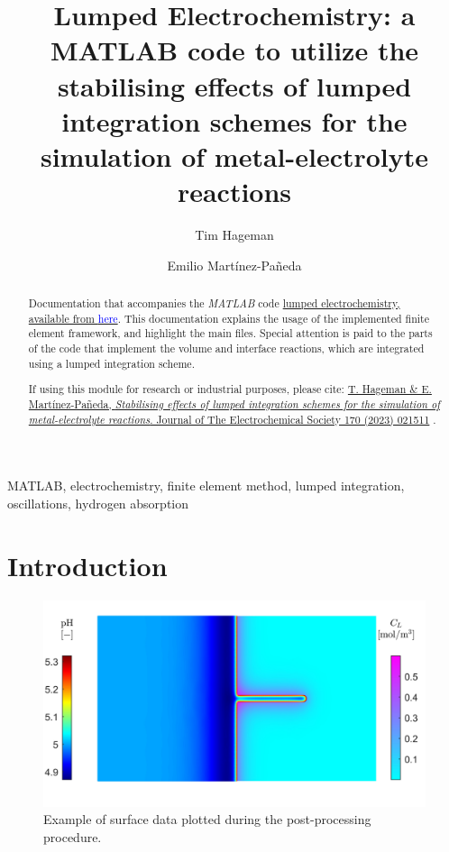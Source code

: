 \documentclass[3p]{elsarticle} %
\newcommand{\citeMe}{\href{http://doi.org/10.1149/1945-7111/acb971}{T. Hageman \& E. Martínez-Pañeda, \textit{Stabilising effects of lumped integration schemes for the simulation of metal-electrolyte reactions}. Journal of The Electrochemical Society 170 (2023) 021511} \citep{Hageman2023}}
\begin{document}
\begin{frontmatter}
\title{Lumped Electrochemistry: a MATLAB code to utilize the stabilising effects of lumped integration schemes for the simulation of metal-electrolyte reactions}

\author{Tim Hageman }
\author{Emilio Martínez-Pañeda}

\address{Department of Civil and Environmental Engineering, Imperial College London, London SW7 2AZ, UK}

\begin{abstract}
Documentation that accompanies the \textit{MATLAB} code \href{https://github.com/T-Hageman/Lumped_Electrochemistry}{lumped electrochemistry, available from \textcolor{blue}{here}}. This documentation explains the usage of the implemented finite element framework, and highlight the main files. Special attention is paid to the parts of the code that implement the volume and interface reactions, which are integrated using a lumped integration scheme. 

If using this module for research or industrial purposes, please cite: \citeMe{}.
\end{abstract}

\begin{keyword}
MATLAB, electrochemistry, finite element method, lumped integration, oscillations, hydrogen absorption
\end{keyword}

\end{frontmatter}

\tableofcontents

\section{Introduction}
\begin{figure}
    \centering
    \includegraphics[width=12cm]{../Figures/SurfacePlot.jpg}
    \caption{Example of surface data plotted during the post-processing procedure.}
    \label{fig:example_surf}
\end{figure}
\end{document}
